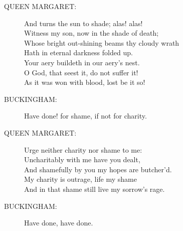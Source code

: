 \documentclass{article}
\begin{document}
\begin{description}
\item[QUEEN MARGARET:] 
\hspace{1pt}And turns the sun to shade; alas! alas!\\
\hspace{1pt}Witness my son, now in the shade of death;\\
\hspace{1pt}Whose bright out-shining beams thy cloudy wrath\\
\hspace{1pt}Hath in eternal darkness folded up.\\
\hspace{1pt}Your aery buildeth in our aery's nest.\\
\hspace{1pt}O God, that seest it, do not suffer it!\\
\hspace{1pt}As it was won with blood, lost be it so!\\
\end{description}
\begin{description}
\item[BUCKINGHAM:] 
\hspace{1pt}Have done! for shame, if not for charity.\\
\end{description}
\begin{description}
\item[QUEEN MARGARET:] 
\hspace{1pt}Urge neither charity nor shame to me:\\
\hspace{1pt}Uncharitably with me have you dealt,\\
\hspace{1pt}And shamefully by you my hopes are butcher'd.\\
\hspace{1pt}My charity is outrage, life my shame\\
\hspace{1pt}And in that shame still live my sorrow's rage.\\
\end{description}
\begin{description}
\item[BUCKINGHAM:] 
\hspace{1pt}Have done, have done.\\
\end{description}
\end{document}
